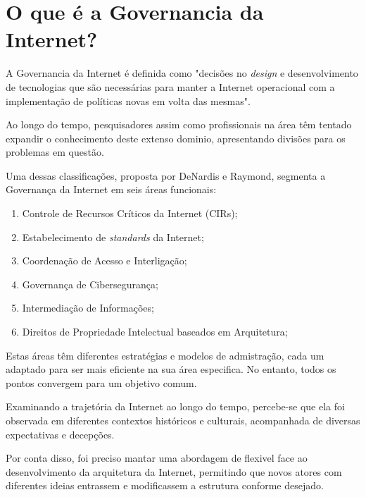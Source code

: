 \section{O que é a Governancia da Internet?}
\label{sec:internetgovernance}
A Governancia da Internet é definida como "decisões no \textit{design} e desenvolvimento 
de tecnologias que são necessárias para manter a Internet operacional com a implementação
de políticas novas em volta das mesmas".

Ao longo do tempo, pesquisadores assim como profissionais na área têm tentado expandir o 
conhecimento deste extenso dominio, apresentando divisões para os problemas em questão.

Uma dessas classificações, proposta por DeNardis e Raymond, segmenta a Governança da Internet em seis áreas funcionais:

\begin{enumerate}
  \item Controle de Recursos Críticos da Internet (CIRs);
  \item Estabelecimento de \textit{standards} da Internet;
  \item Coordenação de Acesso e Interligação;
  \item Governança de Cibersegurança;
  \item Intermediação de Informações;
  \item Direitos de Propriedade Intelectual baseados em Arquitetura;
\end{enumerate}

Estas áreas têm diferentes estratégias e modelos de admistração, cada um adaptado
para ser mais eficiente na sua área especifica. No entanto, todos os pontos 
convergem para um objetivo comum.

Examinando a trajetória da Internet ao longo do tempo, percebe-se que ela foi 
observada em diferentes contextos históricos e culturais, acompanhada de 
diversas expectativas e decepções.

Por conta disso, foi preciso mantar uma abordagem de flexivel face ao desenvolvimento
da arquitetura da Internet, permitindo que novos atores com diferentes ideias entrassem 
e modificassem a estrutura conforme desejado.




